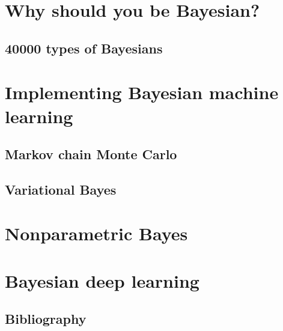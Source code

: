 \documentclass[11pt,fleqn]{book} %
\begin{document}
\part{Why should you be Bayesian?}
    \label{ch:foundations}
    \chapter{40000 types of Bayesians}
    

\part{Implementing Bayesian machine learning}
    \chapter{Markov chain Monte Carlo}
    
    \chapter{Variational Bayes}
    

\part{Nonparametric Bayes}
\part{Bayesian deep learning}

\chapter*{Bibliography}

\printbibliography[heading=bibempty]

\cleardoublepage %
\setlength{\columnsep}{0.75cm} %
\printindex %
\end{document}
